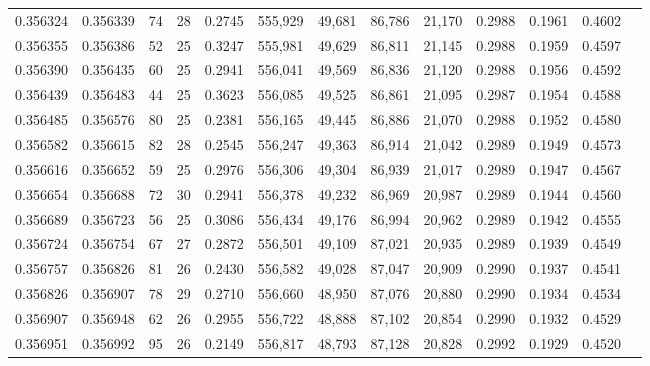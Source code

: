 \begin{tabular}{rrrrrrrrrrrrr}
0.356324 & 0.356339 &    74 &  28 &                                     0.2745 & 555,929 &  49,681 &  86,786 &  21,170 & 0.2988 & 0.1961 & 0.4602 \\
0.356355 & 0.356386 &    52 &  25 &                                     0.3247 & 555,981 &  49,629 &  86,811 &  21,145 & 0.2988 & 0.1959 & 0.4597 \\
0.356390 & 0.356435 &    60 &  25 &                                     0.2941 & 556,041 &  49,569 &  86,836 &  21,120 & 0.2988 & 0.1956 & 0.4592 \\
0.356439 & 0.356483 &    44 &  25 &                                     0.3623 & 556,085 &  49,525 &  86,861 &  21,095 & 0.2987 & 0.1954 & 0.4588 \\
0.356485 & 0.356576 &    80 &  25 &                                     0.2381 & 556,165 &  49,445 &  86,886 &  21,070 & 0.2988 & 0.1952 & 0.4580 \\
0.356582 & 0.356615 &    82 &  28 &                                     0.2545 & 556,247 &  49,363 &  86,914 &  21,042 & 0.2989 & 0.1949 & 0.4573 \\
0.356616 & 0.356652 &    59 &  25 &                                     0.2976 & 556,306 &  49,304 &  86,939 &  21,017 & 0.2989 & 0.1947 & 0.4567 \\
0.356654 & 0.356688 &    72 &  30 &                                     0.2941 & 556,378 &  49,232 &  86,969 &  20,987 & 0.2989 & 0.1944 & 0.4560 \\
0.356689 & 0.356723 &    56 &  25 &                                     0.3086 & 556,434 &  49,176 &  86,994 &  20,962 & 0.2989 & 0.1942 & 0.4555 \\
0.356724 & 0.356754 &    67 &  27 &                                     0.2872 & 556,501 &  49,109 &  87,021 &  20,935 & 0.2989 & 0.1939 & 0.4549 \\
0.356757 & 0.356826 &    81 &  26 &                                     0.2430 & 556,582 &  49,028 &  87,047 &  20,909 & 0.2990 & 0.1937 & 0.4541 \\
0.356826 & 0.356907 &    78 &  29 &                                     0.2710 & 556,660 &  48,950 &  87,076 &  20,880 & 0.2990 & 0.1934 & 0.4534 \\
0.356907 & 0.356948 &    62 &  26 &                                     0.2955 & 556,722 &  48,888 &  87,102 &  20,854 & 0.2990 & 0.1932 & 0.4529 \\
0.356951 & 0.356992 &    95 &  26 &                                     0.2149 & 556,817 &  48,793 &  87,128 &  20,828 & 0.2992 & 0.1929 & 0.4520 \\

\end{tabular}
